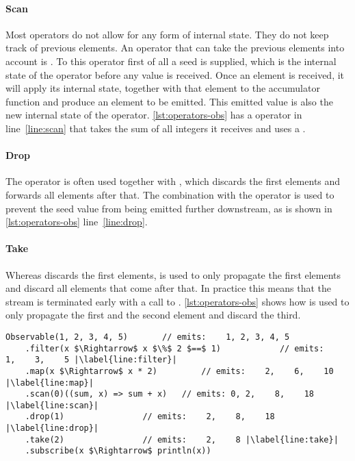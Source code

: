 \paragraph{Scan}Most operators do not allow for any form of internal state. They do not keep track of previous elements. An operator that can take the previous elements into account is . To this operator first of all a seed is supplied, which is the internal state of the operator before any value is received. Once an element is received, it will apply its internal state, together with that element to the accumulator function  and produce an element to be emitted. This emitted value is also the new internal state of the operator. \autoref{lst:operators-obs} has a  operator in line~\ref{line:scan} that takes the sum of all integers it receives and uses a .

\paragraph{Drop}The  operator is often used together with , which discards the first  elements and forwards all elements after that. The combination with the  operator is used to prevent the seed value from being emitted further downstream, as is shown in \autoref{lst:operators-obs} line~\ref{line:drop}.

\paragraph{Take}Whereas  discards the first  elements,  is used to only propagate the first  elements and discard all elements that come after that. In practice this means that the stream is terminated early with a call to . \autoref{lst:operators-obs} shows how  is used to only propagate the first and the second element and discard the third.

\begin{lstlisting}[caption={Operators on \obs}, label={lst:operators-obs}, columns=fixed]
Observable(1, 2, 3, 4, 5)		// emits:    1, 2, 3, 4, 5
    .filter(x $\Rightarrow$ x $\%$ 2 $==$ 1)			// emits:    1,    3,    5 |\label{line:filter}|
    .map(x $\Rightarrow$ x * 2)			// emits:    2,    6,    10 |\label{line:map}|
    .scan(0)((sum, x) => sum + x)	// emits: 0, 2,    8,    18 |\label{line:scan}|
    .drop(1)				// emits:    2,    8,    18 |\label{line:drop}|
    .take(2)				// emits:    2,    8 |\label{line:take}|
    .subscribe(x $\Rightarrow$ println(x))
\end{lstlisting}

